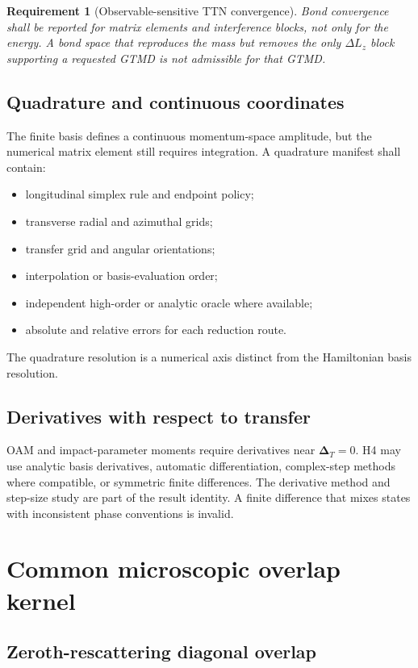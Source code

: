 \documentclass[11pt]{article}
\newtheorem{requirement}[definition]{Requirement}
\newcommand{\DT}{\bm{\Delta}_{T}}
\begin{document}
\begin{requirement}[Observable-sensitive TTN convergence]
Bond convergence shall be reported for matrix elements and interference
blocks, not only for the energy.  A bond space that reproduces the mass but
removes the only \(\Delta L_z\) block supporting a requested GTMD is not
admissible for that GTMD.
\end{requirement}

\subsection{Quadrature and continuous coordinates}

The finite basis defines a continuous momentum-space amplitude, but the
numerical matrix element still requires integration.  A quadrature manifest
shall contain:
\begin{itemize}
\item longitudinal simplex rule and endpoint policy;
\item transverse radial and azimuthal grids;
\item transfer grid and angular orientations;
\item interpolation or basis-evaluation order;
\item independent high-order or analytic oracle where available;
\item absolute and relative errors for each reduction route.
\end{itemize}
The quadrature resolution is a numerical axis distinct from the Hamiltonian
basis resolution.

\subsection{Derivatives with respect to transfer}

OAM and impact-parameter moments require derivatives near \(\DT=0\).  H4 may
use analytic basis derivatives, automatic differentiation, complex-step
methods where compatible, or symmetric finite differences.  The derivative
method and step-size study are part of the result identity.  A finite
difference that mixes states with inconsistent phase conventions is invalid.

\section{Common microscopic overlap kernel}
\label{sec:overlap}

\subsection{Zeroth-rescattering diagonal overlap}
\end{document}
